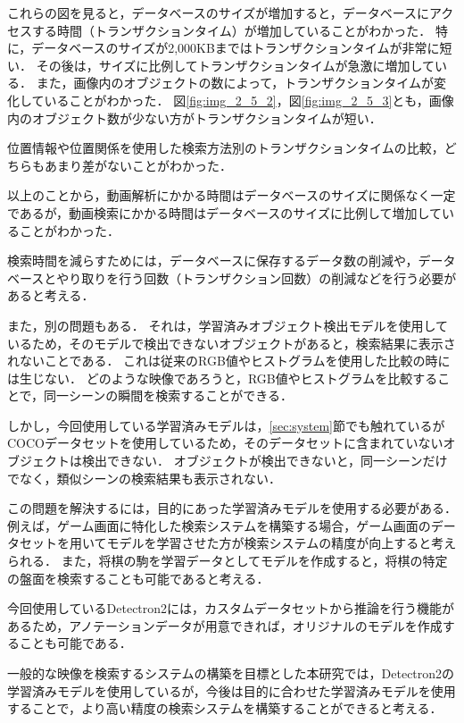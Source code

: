 \documentclass[a4j,12pt,dvipdfmx]{jreport}
\begin{document}
これらの図を見ると，データベースのサイズが増加すると，データベースにアクセスする時間（トランザクションタイム）が増加していることがわかった．
特に，データベースのサイズが2,000KBまではトランザクションタイムが非常に短い．
その後は，サイズに比例してトランザクションタイムが急激に増加している．
また，画像内のオブジェクトの数によって，トランザクションタイムが変化していることがわかった．
図\ref{fig:img_2_5_2}，図\ref{fig:img_2_5_3}とも，画像内のオブジェクト数が少ない方がトランザクションタイムが短い．

位置情報や位置関係を使用した検索方法別のトランザクションタイムの比較，どちらもあまり差がないことがわかった．

以上のことから，動画解析にかかる時間はデータベースのサイズに関係なく一定であるが，動画検索にかかる時間はデータベースのサイズに比例して増加していることがわかった．

検索時間を減らすためには，データベースに保存するデータ数の削減や，データベースとやり取りを行う回数（トランザクション回数）の削減などを行う必要があると考える．

また，別の問題もある．
それは，学習済みオブジェクト検出モデルを使用しているため，そのモデルで検出できないオブジェクトがあると，検索結果に表示されないことである．
これは従来のRGB値やヒストグラムを使用した比較の時には生じない．
どのような映像であろうと，RGB値やヒストグラムを比較することで，同一シーンの瞬間を検索することができる．

しかし，今回使用している学習済みモデルは，\ref{sec:system}節でも触れているがCOCOデータセットを使用しているため，そのデータセットに含まれていないオブジェクトは検出できない．
オブジェクトが検出できないと，同一シーンだけでなく，類似シーンの検索結果も表示されない．

この問題を解決するには，目的にあった学習済みモデルを使用する必要がある．
例えば，ゲーム画面に特化した検索システムを構築する場合，ゲーム画面のデータセットを用いてモデルを学習させた方が検索システムの精度が向上すると考えられる．
また，将棋の駒を学習データとしてモデルを作成すると，将棋の特定の盤面を検索することも可能であると考える．

今回使用しているDetectron2には，カスタムデータセットから推論を行う機能があるため，アノテーションデータが用意できれば，オリジナルのモデルを作成することも可能である．

一般的な映像を検索するシステムの構築を目標とした本研究では，Detectron2の学習済みモデルを使用しているが，今後は目的に合わせた学習済みモデルを使用することで，より高い精度の検索システムを構築することができると考える．
\end{document}
